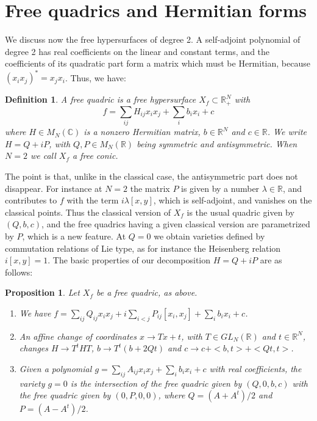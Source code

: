 \documentclass[11pt]{amsart}
\newtheorem{proposition}[theorem]{Proposition}
\newtheorem{definition}[theorem]{Definition}
\theoremstyle{definition}
\begin{document}
\section{Free quadrics and Hermitian forms}

We discuss now the free hypersurfaces of degree 2. A self-adjoint polynomial of degree 2 has real coefficients on the linear and constant terms, and the coefficients of its quadratic part form a matrix which must be Hermitian, because $(x_ix_j)^*=x_jx_i$. Thus, we have:

\begin{definition}\label{d21}
A free quadric is a free hypersurface $X_f\subset\mathbb R^N_+$ with
$$f=\sum_{ij}H_{ij}x_ix_j+\sum_ib_ix_i+c$$
where $H\in M_N(\mathbb C)$ is a nonzero Hermitian matrix, $b\in\mathbb R^N$ and $c\in\mathbb R$. We write $H=Q+iP$, with $Q,P\in M_N(\mathbb R)$ being symmetric and antisymmetric. When $N=2$ we call $X_f$ a free conic.
\end{definition}

The point is that, unlike in the classical case, the antisymmetric part does not disappear. For instance at $N=2$ the matrix $P$ is given by a number $\lambda\in\mathbb R$, and contributes to $f$ with the term $i\lambda[x,y]$, which is self-adjoint, and vanishes on the classical points. Thus the classical version of $X_f$ is the usual quadric given by $(Q,b,c)$, and the free quadrics having a given classical version are parametrized by $P$, which is a new feature. At $Q=0$ we obtain varieties defined by commutation relations of Lie type, as for instance the Heisenberg relation $i[x,y]=1$. The basic properties of our decomposition $H=Q+iP$ are as follows:

\begin{proposition}\label{p22}
Let $X_f$ be a free quadric, as above.
\begin{enumerate}
\item We have $f=\sum_{ij}Q_{ij}x_ix_j+i\sum_{i<j}P_{ij}[x_i,x_j]+\sum_ib_ix_i+c$.

\item An affine change of coordinates $x\to Tx+t$, with $T\in GL_N(\mathbb R)$ and $t\in\mathbb R^N$, changes $H\to T^tHT$, $b\to T^t(b+2Qt)$ and $c\to c+<b,t>+<Qt,t>$.

\item Given a polynomial $g=\sum_{ij}A_{ij}x_ix_j+\sum_ib_ix_i+c$ with real coefficients, the variety $g=0$ is the intersection of the free quadric given by $(Q,0,b,c)$ with the free quadric given by $(0,P,0,0)$, where $Q=(A+A^t)/2$ and $P=(A-A^t)/2$.
\end{enumerate}
\end{proposition}
\end{document}
